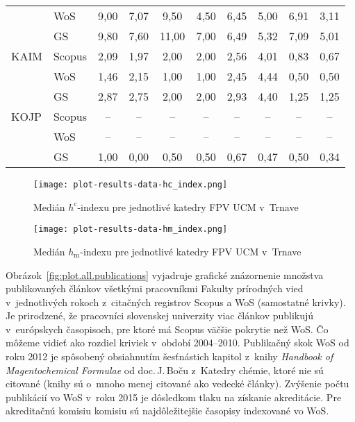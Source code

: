 \begin{table}
\begin{tabular}{llcccccccc}
      & WoS    & 9,00     & 7,07 & 9,50  & 4,50 & 6,45     & 5,00 & 6,91 & 3,11 \\
      & GS     & 9,80     & 7,60 & 11,00 & 7,00 & 6,49     & 5,32 & 7,09 & 5,01 \\[1ex]
 KAIM & Scopus & 2,09     & 1,97 & 2,00  & 2,00 & 2,56     & 4,01 & 0,83 & 0,67 \\
      & WoS    & 1,46     & 2,15 & 1,00  & 1,00 & 2,45     & 4,44 & 0,50 & 0,50 \\
      & GS     & 2,87     & 2,75 & 2,00  & 2,00 & 2,93     & 4,40 & 1,25 & 1,25 \\[1ex]
 KOJP & Scopus & --       & --   & --    & --   & --       & --   & --   & --   \\
      & WoS    & --       & --   & --    & --   & --       & --   & --   & --   \\
      & GS     & 1,00     & 0,00 & 0,50  & 0,50 & 0,67     & 0,47 & 0,50 & 0,34 \\[0.5ex]
  \bottomrule
\end{tabular}
\end{table}

\begin{figure}
  \centering
  \texttt{[image: plot-results-data-hc\_index.png]}
  \caption{Medián $h^\mathrm{c}$-indexu pre jednotlivé katedry FPV UCM v~Trnave}
  \label{fig:hc-index.plot}
\end{figure}

\begin{figure}
  \centering
  \texttt{[image: plot-results-data-hm\_index.png]}
  \caption{Medián $h_\mathrm{m}$-indexu pre jednotlivé katedry FPV UCM v~Trnave}
  \label{fig:hm-index.plot}
\end{figure}



Obrázok~\ref{fig:plot.all.publications} vyjadruje grafické znázornenie množstva
publikovaných článkov všetkými pracovníkmi Fakulty prírodných vied
v~jednotlivých rokoch z~citačných registrov Scopus a WoS (samostatné krivky).
Je prirodzené, že pracovníci slovenskej univerzity viac článkov publikujú
v~európskych časopisoch, pre ktoré má Scopus väčšie pokrytie než WoS.  Čo môžeme
vidieť ako rozdiel kriviek v~období 2004--2010.  Publikačný skok WoS od roku
2012 je spôsobený obsiahnutím šesťnástich kapitol z~knihy \emph{Handbook of
  Magentochemical Formulae} od doc.\,J.\,Boču z~Katedry chémie, ktoré nie sú
citované (knihy sú o~mnoho menej citované ako vedecké články).  Zvýšenie počtu
publikácií vo WoS v~roku 2015 je dôsledkom tlaku na získanie akreditácie.  Pre
akreditačnú komisiu komisiu sú najdôležitejšie časopisy indexované vo WoS.

